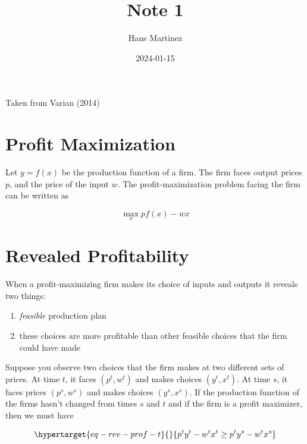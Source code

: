 \documentclass[
]{article}
\title{Note 1}
\author{Hans Martinez}
\date{2024-01-15}
\providecommand{\tightlist}{%
  \setlength{\itemsep}{0pt}\setlength{\parskip}{0pt}}\usepackage{longtable,booktabs,array}
\begin{document}
\maketitle
\ifdefined\Shaded\renewenvironment{Shaded}{\begin{tcolorbox}[enhanced, borderline west={3pt}{0pt}{shadecolor}, sharp corners, breakable, interior hidden, frame hidden, boxrule=0pt]}{\end{tcolorbox}}\fi

Taken from Varian (2014)

\hypertarget{profit-maximization}{%
\section{Profit Maximization}\label{profit-maximization}}

Let \(y=f(x)\) be the production function of a firm. The firm faces
output prices \(p\), and the price of the input \(w\). The
profit-maximization problem facing the firm can be written as

\[
\max_x pf(x)-wx
\]

\hypertarget{revealed-profitability}{%
\section{Revealed Profitability}\label{revealed-profitability}}

When a profit-maximizing firm makes its choice of inputs and outputs it
reveals two things:

\begin{enumerate}
\def\labelenumi{\arabic{enumi}.}
\tightlist
\item
  \emph{feasible} production plan
\item
  these choices are more profitable than other feasible choices that the
  firm could have made
\end{enumerate}

Suppose you observe two choices that the firm makes at two different
sets of prices. At time \(t\), it faces \((p^t,w^t)\) and makes choices
\((y^t,x^t)\). At time \(s\), it faces prices \((p^s,w^s)\) and makes
choices \((y^s,x^s)\). If the production function of the firms hasn't
changed from times \(s\) and \(t\) and if the firm is a profit
maximizer, then we must have

\begin{equation}\protect\hypertarget{eq-rev-prof-t}{}{
p^ty^t-w^tx^t\ge p^ty^s-w^tx^s
}\label{eq-rev-prof-t}\end{equation}
\end{document}
